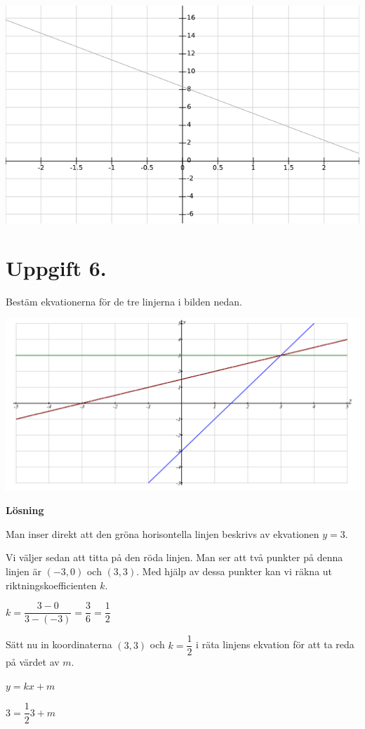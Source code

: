 \documentclass{article}
\begin{document}
\includegraphics[scale=0.65]{graph_1_5_1.png}

\section*{Uppgift 6.}
Bestäm ekvationerna för de tre linjerna i bilden nedan.

\includegraphics[scale=0.36]{graph_1_6_1.png}

\textbf{Lösning}

Man inser direkt att den gröna horisontella linjen beskrivs av ekvationen $y = 3$.

Vi väljer sedan att titta på den röda linjen. Man ser att två punkter på denna linjen är $(-3, 0)$ och $(3, 3)$. Med hjälp av dessa punkter kan vi räkna ut riktningskoefficienten $k$.

$k=\dfrac{3-0}{3-(-3)}=\dfrac{3}{6}=\dfrac{1}{2}$

Sätt nu in koordinaterna $(3, 3)$ och $k = \dfrac{1}{2}$ i räta linjens ekvation för att ta reda på värdet av $m$.

$y = kx + m$

$3 = \dfrac{1}{2}3 + m$
\end{document}
